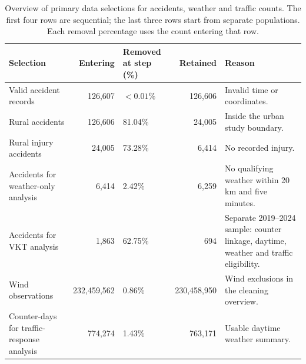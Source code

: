 \begin{table}[htbp]
\centering
\footnotesize
\caption[Primary data selections.]{Overview of primary data selections for accidents, weather and traffic counts. The first four rows are sequential; the last three rows start from separate populations. Each removal percentage uses the count entering that row.}
\label{tab:data-trimming}
\begin{tabularx}{\textwidth}{L{0.23\textwidth}rL{0.13\textwidth}rX}
\toprule
Selection & Entering & Removed at step (\%) & Retained & Reason \\
\midrule
Valid accident records & 126,607 & $<0.01$\% & 126,606 & Invalid time or coordinates. \\ \grayhline
Rural accidents & 126,606 & 81.04\% & 24,005 & Inside the urban study boundary. \\ \grayhline
Rural injury accidents & 24,005 & 73.28\% & 6,414 & No recorded injury. \\ \grayhline
Accidents for weather-only analysis & 6,414 & 2.42\% & 6,259 & No qualifying weather within 20 km and five minutes. \\ \grayhline
Accidents for VKT analysis & 1,863 & 62.75\% & 694 & Separate 2019--2024 sample: counter linkage, daytime, weather and traffic eligibility. \\ \grayhline
Wind observations & 232,459,562 & 0.86\% & 230,458,950 & Wind exclusions in the cleaning overview. \\ \grayhline
Counter-days for traffic-response analysis & 774,274 & 1.43\% & 763,171 & Usable daytime weather summary. \\
\bottomrule
\end{tabularx}
\end{table}
